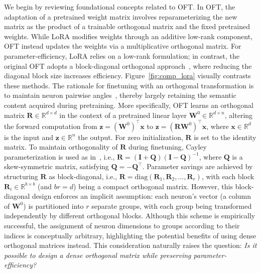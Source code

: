 We begin by reviewing foundational concepts related to OFT. In OFT, the adaptation of a pretrained weight matrix involves reparameterizing the new matrix as the product of a trainable orthogonal matrix and the fixed pretrained weights. While LoRA modifies weights through an additive low-rank component, OFT instead updates the weights via a multiplicative orthogonal matrix. For parameter-efficiency, LoRA relies on a low-rank formulation; in contrast, the original OFT adopts a block-diagonal orthogonal approach~\cite{qiu2023controlling}, where reducing the diagonal block size increases efficiency. Figure~\ref{fig:comp_lora} visually contrasts these methods. The rationale for finetuning with an orthogonal transformation is to maintain neuron pairwise angles~\cite{liu2018learning,liu2021orthogonal,qiu2023controlling}, thereby largely retaining the semantic content acquired during pretraining. More specifically, OFT learns an orthogonal matrix $\bm{R}\in\mathbb{R}^{d\times d}$ in the context of a pretrained linear layer $\bm{W}^0\in\mathbb{R}^{d\times n}$, altering the forward computation from $\bm{z}=(\bm{W}^0)^\top\bm{x}$ to $\bm{z}=(\bm{R}\bm{W}^0)^\top\bm{x}$, where $\bm{x}\in\mathbb{R}^{d}$ is the input and $\bm{z}\in\mathbb{R}^{n}$ the output. For zero initialization, $\bm{R}$ is set to the identity matrix. To maintain orthogonality of $\bm{R}$ during finetuning, Cayley parameterization is used as in~\cite{qiu2023controlling,liu2021orthogonal}, i.e., $\bm{R}=(\bm{I}+\bm{Q})(\bm{I}-\bm{Q})^{-1}$, where $\bm{Q}$ is a skew-symmetric matrix, satisfying $\bm{Q}=-\bm{Q}^\top$. Parameter savings are achieved by structuring $\bm{R}$ as block-diagonal, i.e., $\bm{R} = \text{diag}(\bm{R}_1, \bm{R}_2, \dots, \bm{R}_r)$, with each block $\bm{R}_i\in\mathbb{R}^{b\times b}$ (and $br=d$) being a compact orthogonal matrix. However, this block-diagonal design enforces an implicit assumption: each neuron's vector (a column of $\bm{W}^0$) is partitioned into $r$ separate groups, with each group being transformed independently by different orthogonal blocks. Although this scheme is empirically successful, the assignment of neuron dimensions to groups according to their indices is conceptually arbitrary, highlighting the potential benefits of using dense orthogonal matrices instead. This consideration naturally raises the question: \emph{Is it possible to design a dense orthogonal matrix while preserving parameter-efficiency?}

